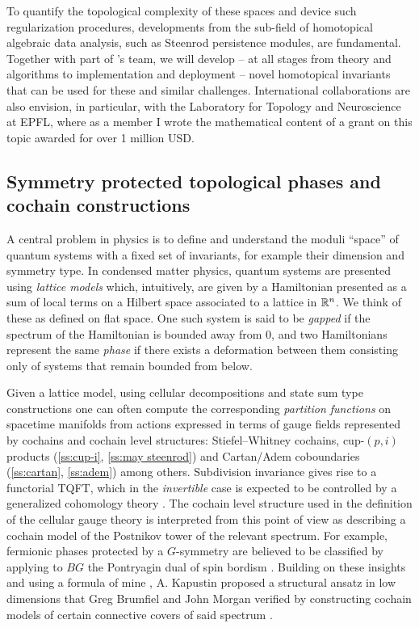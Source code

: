 To quantify the topological complexity of these spaces and device such regularization procedures, developments from the sub-field of homotopical algebraic data analysis, such as Steenrod persistence modules, are fundamental.
Together with part of \giottoTDA's team, we will develop -- at all stages from theory and algorithms to implementation and deployment -- novel homotopical invariants that can be used for these and similar challenges.
International collaborations are also envision, in particular, with the Laboratory for Topology and Neuroscience at EPFL, where as a member I wrote the mathematical content of a grant on this topic awarded for over 1 million USD.

\subsection{Symmetry protected topological phases and cochain constructions} \label{ss:spt phases}

A central problem in physics is to define and understand the moduli ``space'' of quantum systems with a fixed set of invariants, for example their dimension and symmetry type.
In condensed matter physics, quantum systems are presented using \textit{lattice models} which, intuitively, are given by a Hamiltonian presented as a sum of local terms on a Hilbert space associated to a lattice in $\mathbb{R}^n$.
We think of these as defined on flat space.
One such system is said to be \textit{gapped} if the spectrum of the Hamiltonian is bounded away from $0$, and two Hamiltonians represent the same \textit{phase} if there exists a deformation between them consisting only of systems that remain bounded from below.

Given a lattice model, using cellular decompositions and state sum type constructions one can often compute the corresponding \textit{partition functions} on spacetime manifolds from actions expressed in terms of gauge fields represented by cochains and cochain level structures: Stiefel--Whitney cochains, cup-$(p, i)$ products (\cref{ss:cup-i}, \cref{ss:may steenrod}) and Cartan/Adem coboundaries (\cref{ss:cartan}, \cref{ss:adem}) among others.
Subdivision invariance gives rise to a functorial TQFT, which in the \textit{invertible} case is expected to be controlled by a generalized cohomology theory \cite{freed2021reflection}.
The cochain level structure used in the definition of the cellular gauge theory is interpreted from this point of view as describing a cochain model of the Postnikov tower of the relevant spectrum.
For example, fermionic phases protected by a $G$-symmetry are believed to be classified by applying to $BG$ the Pontryagin dual of spin bordism \cite{kapustin2015cobordism, kapustin2017fermionic}.
Building on these insights and using a formula of mine \cite{medina2020cartan}, A. Kapustin proposed a structural ansatz in low dimensions that Greg Brumfiel and John Morgan verified by constructing cochain models of certain connective covers of said spectrum \cite{brumfiel2016pontrjagin, brumfiel2018pontrjagin}.

